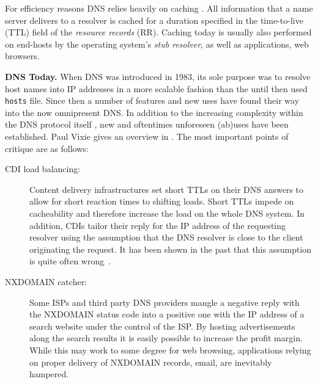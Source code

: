 For efficiency reasons DNS relies heavily on caching
\cite{DNS-caching,DNS-IMC-2010}. All information that a name server delivers to
a resolver is cached for a duration specified in the time-to-live (TTL) field
of the {\em resource records} (RR). Caching today is usually also performed on
end-hosts by the operating system's {\em stub resolver}, as well as
applications, \eg web browsers.

\noindent\textbf{DNS Today.}\label{section:dns-today} When DNS was introduced in
1983, its sole purpose was to resolve host names into IP addresses in a more
scalable fashion than the until then used \texttt{hosts} file. Since then a
number of features and new uses have found their way into the now omnipresent
DNS. In addition to the increasing complexity within the DNS protocol itself
\cite {DNSComplexity2007}, new and oftentimes unforeseen (ab)uses have been
established. Paul Vixie gives an overview in \cite{WhatDNSIsNOT2009}. The most
important points of critique are as follows:

\begin{description} \item[CDI load balancing:] Content delivery infrastructures
set short TTLs on their DNS answers to allow for short reaction times to
shifting loads. Short TTLs impede on cacheability and therefore increase the
load on the whole DNS system. In addition, CDIs tailor their reply for the IP
address of the requesting resolver using the assumption that the DNS resolver
is close to the client originating the request. It has been shown in the past
that this assumption is quite often wrong~\cite
{Precise:Mao2002,dns-redirection,DNS-IMC-2010,DNS-extension-IP-client}.

\item[NXDOMAIN catcher:] Some ISPs and third party DNS providers mangle a
negative reply with the NXDOMAIN status code into a positive one with the IP
address of a search website under the control of the ISP. By hosting
advertisements along the search results it is easily possible to increase the
profit margin. While this may work to some degree for web browsing,
applications relying on proper delivery of NXDOMAIN records, \eg email, are
inevitably hampered.  \end{description}

